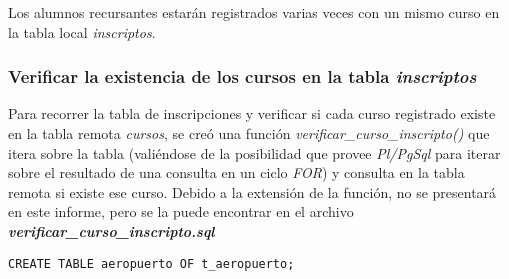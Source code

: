 Los alumnos recursantes estarán registrados varias veces con un mismo curso en la tabla local \emph{inscriptos}. 

\subsubsection{Verificar la existencia de los cursos en la tabla \emph{inscriptos}}

Para recorrer la tabla de inscripciones y verificar si cada curso registrado existe en la tabla remota \emph{cursos}, se creó una función \emph{verificar\_curso\_inscripto()} que itera sobre la tabla (valiéndose de la posibilidad que provee \emph{Pl/PgSql} para iterar sobre el resultado de una consulta en un ciclo \emph{FOR}) y consulta en la tabla remota si existe ese curso. Debido a la extensión de la función, no se presentará en este informe, pero se la puede encontrar en el archivo \textbf{\emph{verificar\_curso\_inscripto.sql}}























\clearpage
\printbibliography




\vspace*{5mm}
\lstset{style=sql}
\begin{lstlisting}
CREATE TABLE aeropuerto OF t_aeropuerto;
\end{lstlisting}
